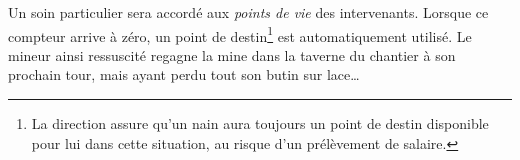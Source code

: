   Un soin particulier sera accordé aux \textit{points de vie} des intervenants.
  Lorsque ce compteur arrive à zéro, un point de destin\footnote{La direction
  assure qu'un nain aura toujours un point de destin disponible pour lui dans
  cette situation, au risque d'un prélèvement de salaire.} est automatiquement
  utilisé. Le mineur ainsi ressuscité regagne la mine dans la taverne du
  chantier à son prochain tour, mais ayant perdu tout son butin sur
  lace\ldots{}
